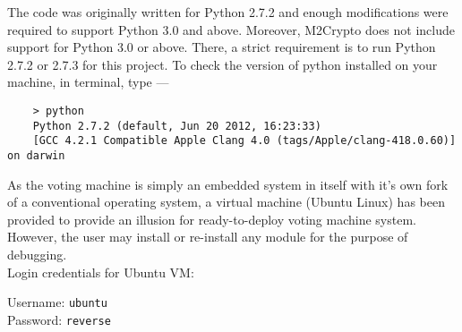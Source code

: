 \documentclass[a4paper, 10pt]{article}
\begin{document}
The code was originally written for Python 2.7.2 and enough modifications were required to support Python 3.0 and above. Moreover, M2Crypto does not include support for Python 3.0 or above. There, a strict requirement is to run Python 2.7.2 or 2.7.3 for this project. To check the version of python installed on your machine, in terminal, type ---

\begin{verbatim}
	> python
	Python 2.7.2 (default, Jun 20 2012, 16:23:33)
	[GCC 4.2.1 Compatible Apple Clang 4.0 (tags/Apple/clang-418.0.60)] on darwin
\end{verbatim}

As the voting machine is simply an embedded system in itself with it's own fork of a conventional operating system, a virtual machine (Ubuntu Linux) has been provided to provide an illusion for ready-to-deploy voting machine system. However, the user may install or re-install any module for the purpose of debugging.\\

\noindent Login credentials for Ubuntu VM:

\noindent Username: \verb+ubuntu+\\
\noindent Password: \verb+reverse+
\end{document}
